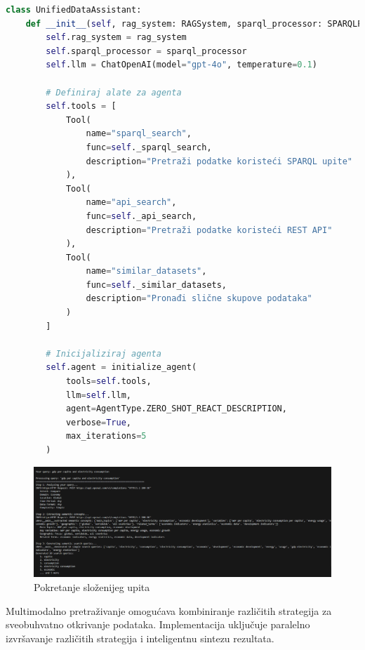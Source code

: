 \begin{lstlisting}[language=Python, caption=Implementacija Unified Data Assistant]
class UnifiedDataAssistant:
    def __init__(self, rag_system: RAGSystem, sparql_processor: SPARQLProcessor):
        self.rag_system = rag_system
        self.sparql_processor = sparql_processor
        self.llm = ChatOpenAI(model="gpt-4o", temperature=0.1)
        
        # Definiraj alate za agenta
        self.tools = [
            Tool(
                name="sparql_search",
                func=self._sparql_search,
                description="Pretraži podatke koristeći SPARQL upite"
            ),
            Tool(
                name="api_search",
                func=self._api_search,
                description="Pretraži podatke koristeći REST API"
            ),
            Tool(
                name="similar_datasets",
                func=self._similar_datasets,
                description="Pronađi slične skupove podataka"
            )
        ]
        
        # Inicijaliziraj agenta
        self.agent = initialize_agent(
            tools=self.tools,
            llm=self.llm,
            agent=AgentType.ZERO_SHOT_REACT_DESCRIPTION,
            verbose=True,
            max_iterations=5
        )
\end{lstlisting}

\begin{figure}[htbp]
    \centering
    \includegraphics[width=1\textwidth]{figures/1.png}
    \caption{Pokretanje složenijeg upita}
    \label{fig:unified_data_assistant}
\end{figure}

Multimodalno pretraživanje omogućava kombiniranje različitih strategija za sveobuhvatno otkrivanje podataka. Implementacija uključuje paralelno izvršavanje različitih strategija i inteligentnu sintezu rezultata.

